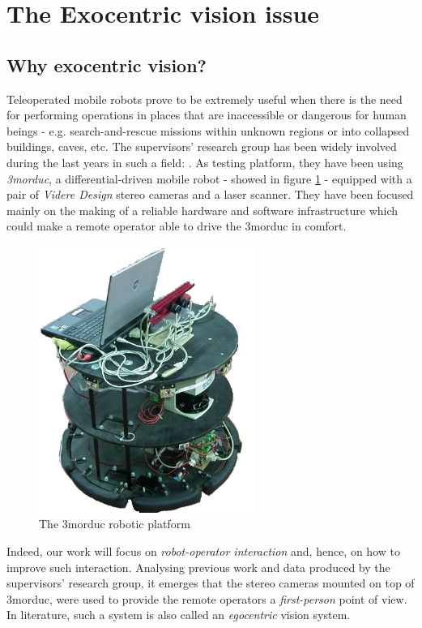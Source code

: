 \section{The Exocentric vision issue}
\label{sec:exo}
\subsection{Why exocentric vision?}
Teleoperated mobile robots prove to be extremely useful 
when there is the need for performing operations in places that 
are inaccessible or dangerous for human beings - e.g. 
search-and-rescue missions within unknown regions or into 
collapsed buildings, caves, etc.
%
The supervisors' research group has been widely involved 
during the last years in such a field: \cite{livatino2010}.
%
As testing platform, they have been using \textit{3morduc},
a differential-driven mobile robot - showed in figure \ref{fig:3morduc} -
equipped with a pair of \textit{Videre Design} \cite{videredesign} 
stereo cameras and a laser scanner. They have been focused 
mainly on the making of a reliable hardware and software 
infrastructure which could make a remote operator able to drive 
the 3morduc in comfort.
%
\begin{figure}[!h]
  \begin{center}
    \includegraphics[width=200pt]{img/3morduc.jpg}  %
    \caption{The 3morduc robotic platform}
    \label{fig:3morduc}
  \end{center}
\end{figure}
%
Indeed, our work will focus on \textit{robot-operator interaction} and, 
hence, on how to improve such interaction. 
%
Analysing previous work and data produced by the supervisors' 
research group, it emerges that the stereo cameras mounted on 
top of 3morduc, were used to provide the remote operators a 
\textit{first-person} point of view. In literature, such a 
system is also called an \textit{egocentric} vision system.
%


